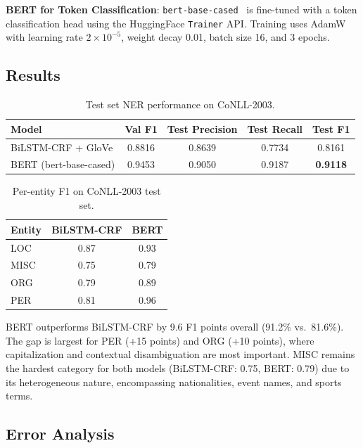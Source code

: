 \documentclass[12pt,a4paper]{article}
\begin{document}
\textbf{BERT for Token Classification}: \texttt{bert-base-cased}~\citep{devlin2019bert} is fine-tuned with a token classification head using the HuggingFace \texttt{Trainer} API. Training uses AdamW with learning rate $2 \times 10^{-5}$, weight decay 0.01, batch size 16, and 3 epochs.

\subsection{Results}

\begin{table}[H]
\centering
\caption{Test set NER performance on CoNLL-2003.}
\label{tab:q2_results}
\begin{tabular}{lcccc}
\toprule
\textbf{Model} & \textbf{Val F1} & \textbf{Test Precision} & \textbf{Test Recall} & \textbf{Test F1} \\
\midrule
BiLSTM-CRF + GloVe   & 0.8816 & 0.8639 & 0.7734 & 0.8161 \\
BERT (bert-base-cased) & 0.9453 & 0.9050 & 0.9187 & \textbf{0.9118} \\
\bottomrule
\end{tabular}
\end{table}

\begin{table}[H]
\centering
\caption{Per-entity F1 on CoNLL-2003 test set.}
\label{tab:q2_entity}
\begin{tabular}{lcc}
\toprule
\textbf{Entity} & \textbf{BiLSTM-CRF} & \textbf{BERT} \\
\midrule
LOC  & 0.87 & 0.93 \\
MISC & 0.75 & 0.79 \\
ORG  & 0.79 & 0.89 \\
PER  & 0.81 & 0.96 \\
\bottomrule
\end{tabular}
\end{table}

BERT outperforms BiLSTM-CRF by 9.6 F1 points overall (91.2\% vs.\ 81.6\%). The gap is largest for PER (+15 points) and ORG (+10 points), where capitalization and contextual disambiguation are most important. MISC remains the hardest category for both models (BiLSTM-CRF: 0.75, BERT: 0.79) due to its heterogeneous nature, encompassing nationalities, event names, and sports terms.

\subsection{Error Analysis}
\end{document}
